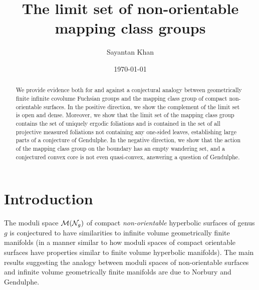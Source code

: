 \documentclass[12pt, reqno]{amsart}
\title{The limit set of non-orientable mapping class groups}
\author{Sayantan Khan}
\date{\today}
\begin{document}
\begin{abstract}
  We provide evidence both for and against a conjectural analogy between geometrically finite infinite covolume Fuchsian groups and the mapping class group of compact non-orientable surfaces.
  In the positive direction, we show the complement of the limit set is open and dense. 
  Moreover, we show that the limit set of the mapping class group contains the set of uniquely ergodic foliations and is contained in the set of all projective measured foliations not containing any one-sided leaves, establishing large parts of a conjecture of Gendulphe.
  In the negative direction, we show that the action of the mapping class group on the boundary has an empty wandering set, and a conjectured convex core is not even quasi-convex, answering a question of Gendulphe.
%
\end{abstract}
\maketitle


\section{Introduction}
\label{sec:introduction-v2}

The moduli space $\mathcal{M}(\mathcal{N}_g)$ of compact \emph{non-orientable} hyperbolic surfaces of genus $g$ is conjectured to have similarities to infinite volume geometrically finite manifolds (in a manner similar to how moduli spaces of compact orientable surfaces have properties similar to finite volume hyperbolic manifolds).
The main results suggesting the analogy between moduli spaces of non-orientable surfaces and infinite volume geometrically finite manifolds are due to Norbury and Gendulphe.
\end{document}
